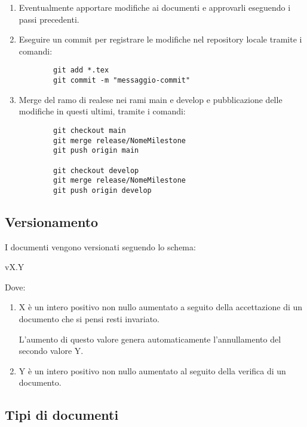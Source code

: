 \documentclass[a4paper, 12pt]{article}
\begin{document}
\begin{enumerate}
    \item Eventualmente apportare modifiche ai documenti e approvarli eseguendo i passi precedenti.
    
    \item Eseguire un commit per registrare le modifiche nel repository locale tramite i comandi:
    \begin{lstlisting}
        git add *.tex
        git commit -m "messaggio-commit"
    \end{lstlisting}

    \item Merge del ramo di realese nei rami main e develop e pubblicazione delle modifiche in questi ultimi, tramite i comandi:
    \begin{lstlisting}
        git checkout main 
        git merge release/NomeMilestone
        git push origin main

        git checkout develop
        git merge release/NomeMilestone
        git push origin develop
    \end{lstlisting}
\end{enumerate}

\subsection{Versionamento}
\label{subsec:vers}
I documenti vengono versionati seguendo lo schema:
\begin{center}
    vX.Y 
\end{center}
Dove:
\begin{enumerate}
    \item X è un intero positivo non nullo aumentato a seguito della accettazione di un documento che si pensi resti invariato.
    
    L'aumento di questo valore genera automaticamente l'annullamento del secondo valore Y.

    \item Y è un intero positivo non nullo aumentato al seguito della verifica di un documento.
\end{enumerate}

\subsection{Tipi di documenti}
\label{subsec:docs}
\end{document}

